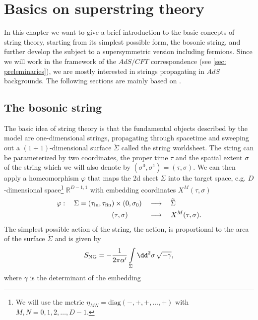 \chapter{Basics on superstring theory}\label{ch: string_basics}
In this chapter we want to give a brief introduction to the basic concepts of string theory, starting from its simplest possible form, the bosonic string, and further develop the subject to a supersymmetric version including fermions. Since we will work in the framework of the $AdS/CFT$ correspondence (see \autoref{sec: preleminaries}), we are mostly interested in strings propagating in $AdS$ backgrounds. The following sections are mainly based on \cite{Polchinski:1998rq,Polchinski:1998rr,Ammon:2015wua,Becker:2007zj}.
%
%
%
%
%
%
%
\section{The bosonic string}
The basic idea of string theory is that the fundamental objects described by the model are one-dimensional strings, propagating through spacetime and sweeping out a $(1+1)$-dimensional surface $\widetilde{\Sigma}$ called the string worldsheet. The string can be parameterized by two coordinates, the proper time $\tau$ and the spatial extent $\sigma$ of the string which we will also denote by $(\sigma^{0},\sigma^{1})=(\tau,\sigma)$. We can then apply a homeomorphism $\varphi$ that maps the 2d sheet $\Sigma$ into the target space, e.g. $D$-dimensional  space\footnote{We will use the metric $\eta_{MN}=\text{diag}(-,+,+,\ldots,+)$ with $M,N=0,1,2,\ldots,D-1.$} $\mathbb{R}^{D-1,1}$ with embedding coordinates $X^{M}(\tau,\sigma)$
%
%
\begin{equation}
\begin{alignedat}{3}
\varphi :\quad  \Sigma = (\tau_{\rm in},\tau_{\rm fin}) \times (0,\sigma_{0}) \quad &\longrightarrow \quad \widetilde{\Sigma} \\
(\tau,\sigma) \qquad\quad &\longrightarrow \quad X^{M}(\tau,\sigma).
\end{alignedat}
\end{equation}
%
%
The simplest possible action of the string, the  action, is proportional to the area of the surface $\widetilde{\Sigma}$ and is given by
%
%
\begin{equation}
S_{\rm NG} = -\frac{1}{2\pi\alpha'} \int\limits_{\Sigma} \dd^{2}\sigma \, \sqrt{-\gamma},
\end{equation}
%
%
where $\gamma$ is the  determinant of the embedding
